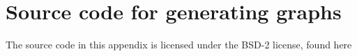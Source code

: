 \chapter{Source code for generating graphs}
\label{apA-graphs}

The source code in this appendix is licensed under the BSD-2 license, found here





